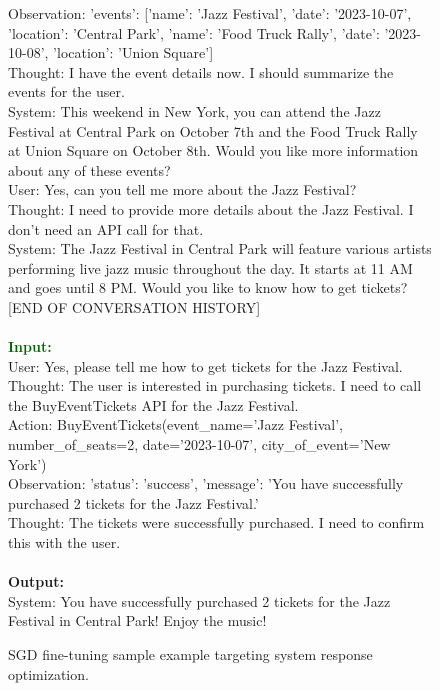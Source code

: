 \begin{figure*}[!ht]
\begin{tcolorbox}[colback=gray!5!white,colframe=black!95!black,title=\textbf{\small{SGD Instruction Sample} | \textbf{Format:} System Response Optimization}]
Observation: {'events': [{'name': 'Jazz Festival', 'date': '2023-10-07', 'location': 'Central Park'}, {'name': 'Food Truck Rally', 'date': '2023-10-08', 'location': 'Union Square'}]} \\
Thought: I have the event details now. I should summarize the events for the user. \\
System: This weekend in New York, you can attend the Jazz Festival at Central Park on October 7th and the Food Truck Rally at Union Square on October 8th. Would you like more information about any of these events? \\
User: Yes, can you tell me more about the Jazz Festival? \\
Thought: I need to provide more details about the Jazz Festival. I don't need an API call for that. \\
System: The Jazz Festival in Central Park will feature various artists performing live jazz music throughout the day. It starts at 11 AM and goes until 8 PM. Would you like to know how to get tickets? \\
{[END OF CONVERSATION HISTORY]} \\
 \\
\small \textcolor{darkgreen}{\textbf{Input:}} \\
User: Yes, please tell me how to get tickets for the Jazz Festival. \\
Thought: The user is interested in purchasing tickets. I need to call the BuyEventTickets API for the Jazz Festival. \\
Action: BuyEventTickets(event\_name='Jazz Festival', number\_of\_seats=2, date='2023-10-07', city\_of\_event='New York') \\
Observation: {'status': 'success', 'message': 'You have successfully purchased 2 tickets for the Jazz Festival.'} \\
Thought: The tickets were successfully purchased. I need to confirm this with the user. \\
 \\
\small \textcolor{mypurple}{\textbf{Output:}} \\
System: You have successfully purchased 2 tickets for the Jazz Festival in Central Park! Enjoy the music! \\
\end{tcolorbox}

\vspace{-0.25cm}
\caption{SGD fine-tuning sample example targeting system response optimization.}
\label{tab:sgd-sft-response}
\end{figure*}


